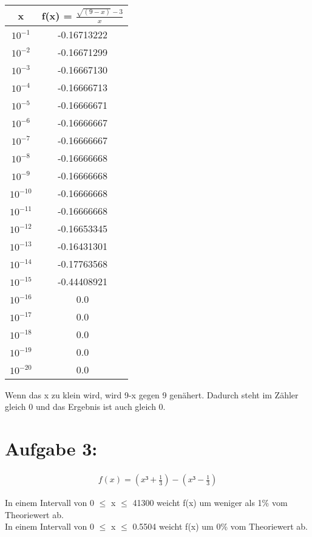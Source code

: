 \begin{table}
  \centering
  \begin{tabular}{c|c}
		x & f(x) = $\frac{\sqrt{(9-x)}-3}{x}$ \\
		\hline
		$10^{-1}$  & -0.16713222 \\
		$10^{-2}$  & -0.16671299 \\
		$10^{-3}$  & -0.16667130 \\
		$10^{-4}$  & -0.16666713 \\
		$10^{-5}$  & -0.16666671 \\
		$10^{-6}$  & -0.16666667 \\
		$10^{-7}$  & -0.16666667 \\
		$10^{-8}$  & -0.16666668 \\
		$10^{-9}$  & -0.16666668 \\
		$10^{-10}$ & -0.16666668 \\
		$10^{-11}$ & -0.16666668 \\
		$10^{-12}$ & -0.16653345 \\
		$10^{-13}$ & -0.16431301 \\
		$10^{-14}$ & -0.17763568 \\
		$10^{-15}$ & -0.44408921 \\
		$10^{-16}$ & 	0.0 \\
		$10^{-17}$ & 	0.0 \\
		$10^{-18}$ &  0.0 \\
		$10^{-19}$ &  0.0 \\
		$10^{-20}$ &  0.0 \\
  \end{tabular}
\end{table}

Wenn das x zu klein wird, wird 9-x gegen 9 genähert. Dadurch steht im Zähler gleich 0 und das Ergebnis ist auch gleich 0.

\newpage
\section*{Aufgabe 3:}

\begin{align*}
	f(x) = (x³ + \frac{1}{3}) - (x³ - \frac{1}{3})
\end{align*}

In einem Intervall von 0 $\le$ x $\le$ 41300 weicht f(x) um weniger als 1\% vom Theoriewert ab. \\
In einem Intervall von 0 $\le$ x $\le$ 0.5504 weicht f(x) um 0\% vom Theoriewert ab. \\

